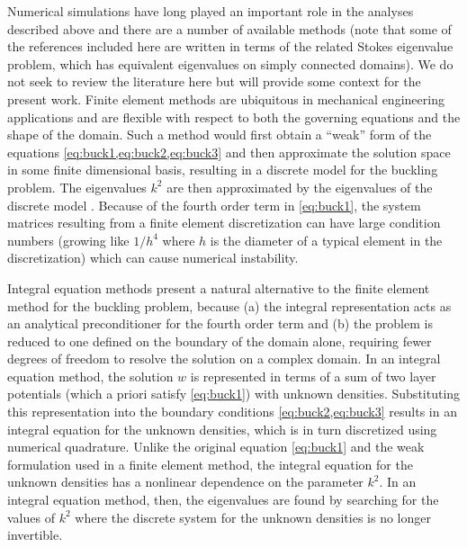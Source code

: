 Numerical simulations have long played an important
role in the analyses described above and there are a number
of available methods (note that some of the references
included here are written in terms of the related
Stokes eigenvalue problem, which has equivalent
eigenvalues on simply connected domains). We do not
seek to review the literature here but will provide
some context for the present work. Finite element methods
are ubiquitous in mechanical engineering applications
and are flexible with respect to both the governing
equations and the shape of the domain. Such a method
would first obtain a ``weak'' form of the equations
\cref{eq:buck1,eq:buck2,eq:buck3} and then 
approximate the solution space in some
finite dimensional basis, resulting in a discrete model
for the buckling problem.
The eigenvalues $k^2$ are then
approximated by the eigenvalues of the discrete
model \cite{johnson1974beam,rannacher1979nonconforming,
  jia2009approximation,carstensen2014guaranteed}.
Because of the fourth order term in \cref{eq:buck1},
the system matrices resulting from a finite element
discretization can have large condition numbers (growing
like $1/h^4$ where $h$ is the diameter of a typical element
in the discretization) which can cause numerical instability.

Integral equation methods \cite{kress1989linear,
  atkinson2009numerical,kitahara2014boundary} present
a natural alternative to the finite element method
for the buckling problem, because (a) the
integral representation acts as an analytical preconditioner
for the fourth order term and (b) the problem is reduced
to one defined on the boundary of the domain alone,
requiring fewer degrees of freedom to resolve the solution
on a complex domain. In an integral equation method,
the solution $w$ is represented in terms of a sum of
two layer potentials (which a priori satisfy
\cref{eq:buck1}) with unknown densities. Substituting this
representation into the boundary conditions
\cref{eq:buck2,eq:buck3} results in an integral equation
for the unknown densities, which
is in turn discretized using numerical quadrature.
Unlike the original equation \cref{eq:buck1} and the weak
formulation used in a finite element method, the integral
equation for the unknown densities has a nonlinear dependence
on the parameter $k^2$. In an integral equation method, then,
the eigenvalues are found by searching for the values
of $k^2$ where the discrete system for the unknown densities
is no longer invertible.


